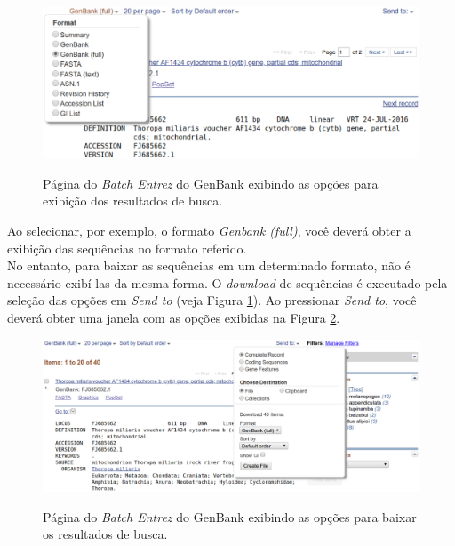 \begin{refsection}
  \begin{figure}[H]
      {\includegraphics[scale=0.5]{figures/tut7/display_settings.eps}}
	{\caption[GenBnank \textit{Batch Entrez}: seleção de formato de exibição]{Página do \textit{Batch Entrez} do GenBank exibindo as opções para exibição dos resultados de busca.}\label{tut7:fig:display_settings}}
  \end{figure}


Ao selecionar, por exemplo, o formato \textit{Genbank (full)}, você deverá obter a exibição das sequências no formato referido.\\
No entanto, para baixar as sequências em um determinado formato, não é necessário exibí-las da mesma forma. O \textit{download} de sequências é executado pela seleção das opções em \textit{Send to} (veja Figura \ref{tut7:fig:display_settings}). Ao pressionar \textit{Send to}, você deverá obter uma janela com as opções exibidas na Figura \ref{tut7:fig:send_to_file}.\\

  \begin{figure}[H]
      {\includegraphics[scale=0.3]{figures/tut7/send_to_file.eps}}
	{\caption[GenBnank \textit{Batch Entrez}: seleção de formato para baixar sequências]{Página do \textit{Batch Entrez} do GenBank exibindo as opções para baixar os resultados de busca.}\label{tut7:fig:send_to_file}}
  \end{figure}


\end{refsection}
